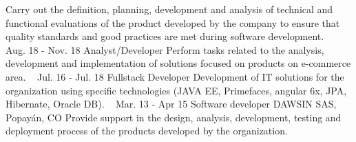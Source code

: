 \documentclass[american]{cv-class}
\begin{document}
\begin{entrylist}
	{Carry out the definition, planning, development and analysis of technical and functional evaluations of the product developed by the company to ensure that quality standards and good practices are met during software development.}
	~ 
    \entry
	{Aug. 18 - Nov. 18}
	{Analyst/Developer}
	{\href{http://www.serviciosenweb.com/}{ }}
	{Perform tasks related to the analysis, development and implementation of solutions focused on products on e-commerce area.}
	~ 
    \entry
	{Jul. 16 - Jul. 18}
	{Fullstack Developer}
	{\href{https://sitis.com.co/}{ }}
	{Development of IT solutions for the organization using specific technologies (JAVA EE, Primefaces, angular 6x, JPA, Hibernate, Oracle DB).}
	~ 
    \entry
	{Mar. 13 - Apr 15}
	{Software developer}
	{DAWSIN SAS, Popayán, CO}
	{Provide support in the design, analysis, development, testing and deployment process of the products developed by the organization.}
\end{entrylist}
\end{document}
